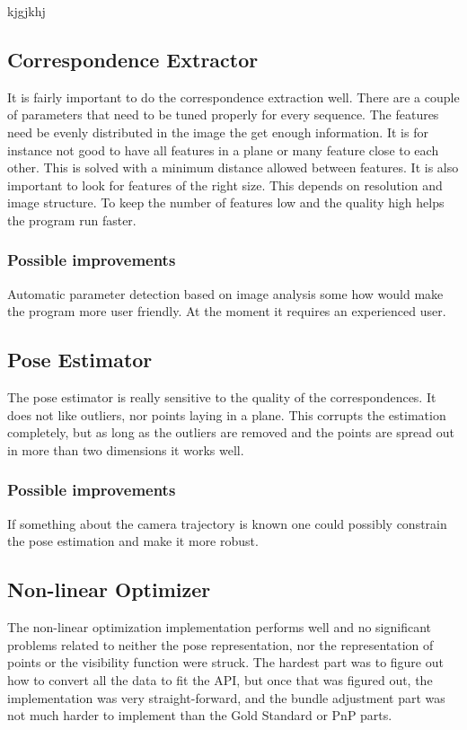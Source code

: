 kjgjkhj

\subsection{Correspondence Extractor}
It is fairly important to do the correspondence extraction well. There are a couple of parameters that need to be tuned properly for every sequence. The features need be evenly distributed in the image the get enough information. It is for instance not good to have all features in a plane or many feature close to each other. This is solved with a minimum distance allowed between features. It is also important to look for features of the right size. This depends on resolution and image structure. To keep the number of features low and the quality high helps the program run faster. 

\subsubsection{Possible improvements}
Automatic parameter detection based on image analysis some how would make the program more user friendly. At the moment it requires an experienced user. 

\subsection{Pose Estimator}
The pose estimator is really sensitive to the quality of the correspondences. It does not like outliers, nor points laying in a plane. This corrupts the estimation completely, but as long as the outliers are removed and the points are spread out in more than two dimensions it works well.

\subsubsection{Possible improvements}
If something about the camera trajectory is known one could possibly constrain the pose estimation and make it more robust. 

\subsection{Non-linear Optimizer}
The non-linear optimization implementation performs well and no significant problems related to neither the pose representation, nor the representation of points or the visibility function were struck. The hardest part was to figure out how to convert all the data to fit the API, but once that was figured out, the implementation was very straight-forward, and the bundle adjustment part was not much harder to implement than the Gold Standard or PnP parts.

